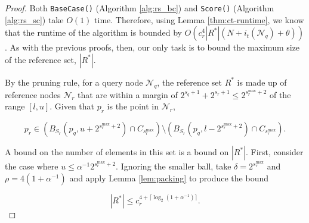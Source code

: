 \begin{proof}
Both \texttt{BaseCase()} (Algorithm \ref{alg:rs_bc}) and \texttt{Score()}
(Algorithm \ref{alg:rs_sc}) take $O(1)$ time.  Therefore, using Lemma
\ref{thm:ct-runtime}, we know that the runtime of the algorithm is bounded by
$O(c_r^4 |R^*| (N + i_t(\mathscr{N}_q) + \theta))$.  As with the previous
proofs, then, our only task is to bound the maximum size of the reference set,
$|R^*|$.

By the pruning rule, for a query node $\mathscr{N}_q$, the reference set $R^*$
is made up of reference nodes $\mathscr{N}_r$ that are within a margin of
$2^{s_q + 1} + 2^{s_r + 1} \le 2^{s_r^{\max} + 2}$ of the range $[l, u]$.  Given
that $p_r$ is the point in $\mathscr{N}_r$,

\begin{equation}
p_r \in \left( B_{S_r}(p_q, u + 2^{s_r^{\max} + 2}) \cap
C_{s_r^{\max}}\right)\setminus \left( B_{S_r}(p_q, l - 2^{s_r^{\max} + 2}) \cap
C_{s_r^{\max}} \right). \label{eqn:rsballs}
\end{equation}

A bound on the number of elements in this set is a bound on $|R^*|$.  %
First, consider the case where $u \le \alpha^{-1} 2^{s_r^{\max} + 2}$.  Ignoring
the smaller ball, take $\delta = 2^{s_r^{\max}}$ and $\rho = 4 (1 +
\alpha^{-1})$ and apply Lemma \ref{lem:packing} to produce the bound

\begin{equation}
|R^*| \le c_r^{4 + \lceil \log_2(1 + \alpha^{-1}) \rceil}.
\end{equation}



\end{proof}
